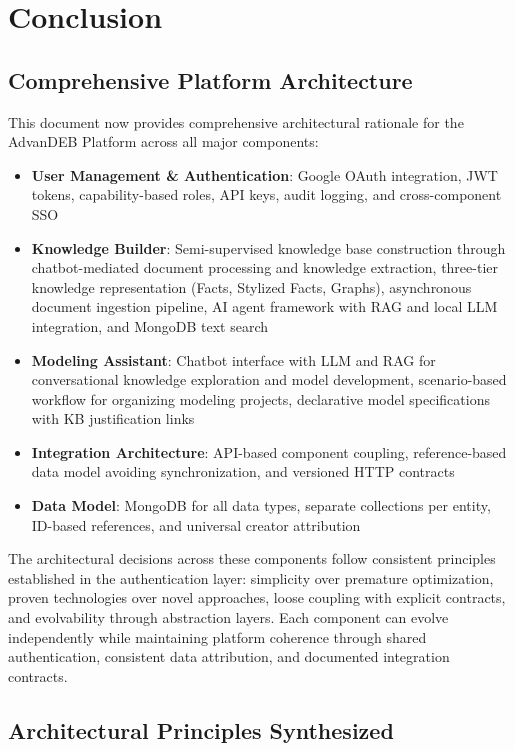 \documentclass[12pt,a4paper]{article}
\begin{document}
\section{Conclusion}

\subsection{Comprehensive Platform Architecture}

This document now provides comprehensive architectural rationale for the AdvanDEB Platform across all major components:

\begin{itemize}[leftmargin=*]
    \item \textbf{User Management \& Authentication}: Google OAuth integration, JWT tokens, capability-based roles, API keys, audit logging, and cross-component SSO
    \item \textbf{Knowledge Builder}: Semi-supervised knowledge base construction through chatbot-mediated document processing and knowledge extraction, three-tier knowledge representation (Facts, Stylized Facts, Graphs), asynchronous document ingestion pipeline, AI agent framework with RAG and local LLM integration, and MongoDB text search
    \item \textbf{Modeling Assistant}: Chatbot interface with LLM and RAG for conversational knowledge exploration and model development, scenario-based workflow for organizing modeling projects, declarative model specifications with KB justification links
    \item \textbf{Integration Architecture}: API-based component coupling, reference-based data model avoiding synchronization, and versioned HTTP contracts
    \item \textbf{Data Model}: MongoDB for all data types, separate collections per entity, ID-based references, and universal creator attribution
\end{itemize}

The architectural decisions across these components follow consistent principles established in the authentication layer: simplicity over premature optimization, proven technologies over novel approaches, loose coupling with explicit contracts, and evolvability through abstraction layers. Each component can evolve independently while maintaining platform coherence through shared authentication, consistent data attribution, and documented integration contracts.

\subsection{Architectural Principles Synthesized}
\end{document}
